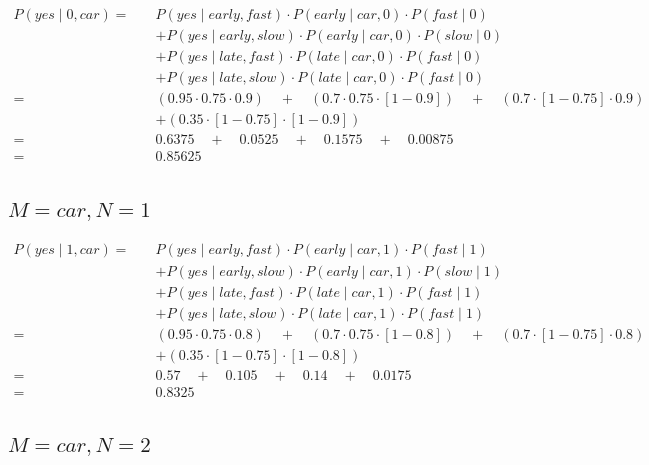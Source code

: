 \documentclass[12pt,letterpaper]{article}
\begin{document}
\begin{align*}
    P(yes \mid 0, car) = \quad &P(yes \mid early, fast) \cdot P(early \mid car, 0) \cdot P(fast \mid 0) \\
                                &+ P(yes \mid early, slow) \cdot P(early \mid car, 0) \cdot P(slow \mid 0) \\
                                &+ P(yes \mid late, fast) \cdot P(late \mid car, 0) \cdot P(fast \mid 0) \\
                                &+ P(yes \mid late, slow) \cdot P(late \mid car, 0) \cdot P(fast \mid 0) \\
    = \quad &(0.95 \cdot 0.75 \cdot 0.9) \quad + \quad (0.7 \cdot 0.75 \cdot [1-0.9]) \quad + \quad (0.7 \cdot [1-0.75] \cdot 0.9) \\
            &+ (0.35 \cdot [1-0.75] \cdot [1-0.9]) \\
    = \quad &0.6375 \quad + \quad 0.0525 \quad + \quad 0.1575 \quad + \quad 0.00875 \\
    = \quad &0.85625
\end{align*}

\subsection{$M = car, N = 1$}

\begin{align*}
    P(yes \mid 1, car) = \quad &P(yes \mid early, fast) \cdot P(early \mid car, 1) \cdot P(fast \mid 1) \\
                                &+ P(yes \mid early, slow) \cdot P(early \mid car, 1) \cdot P(slow \mid 1) \\
                                &+ P(yes \mid late, fast) \cdot P(late \mid car, 1) \cdot P(fast \mid 1) \\
                                &+ P(yes \mid late, slow) \cdot P(late \mid car, 1) \cdot P(fast \mid 1) \\
    = \quad &(0.95 \cdot 0.75 \cdot 0.8) \quad + \quad (0.7 \cdot 0.75 \cdot [1-0.8]) \quad + \quad (0.7 \cdot [1-0.75] \cdot 0.8) \\
            &+ (0.35 \cdot [1-0.75] \cdot [1-0.8]) \\
    = \quad &0.57 \quad + \quad 0.105 \quad + \quad 0.14 \quad + \quad 0.0175 \\
    = \quad &0.8325
\end{align*}

\subsection{$M = car, N = 2$}
\end{document}
